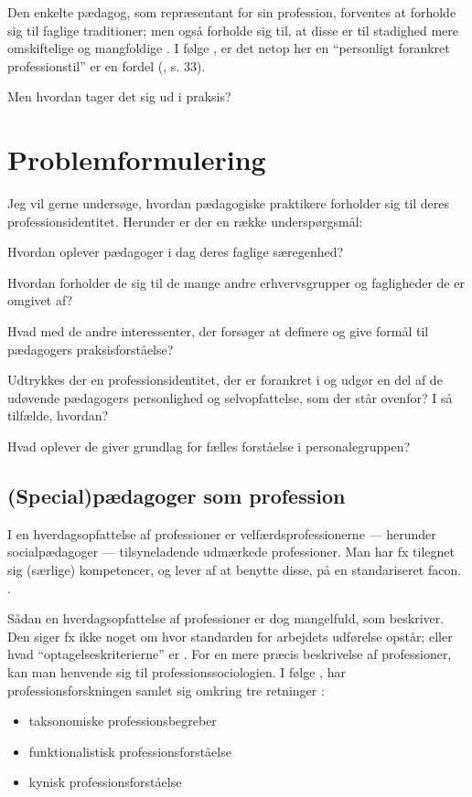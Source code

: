 Den enkelte pædagog, som repræsentant for sin profession, forventes at forholde sig til faglige traditioner; men også forholde sig til, at disse er til stadighed mere omskiftelige og mangfoldige \autocite{hansbolKonstruktionAfProfessionel2008}. I følge \citeauthor{hansbolKonstruktionAfProfessionel2008}, er det netop her en “personligt forankret professionstil” er en fordel (\citeyear{hansbolKonstruktionAfProfessionel2008}, s. 33).


Men hvordan tager det sig ud i praksis?

\section{Problemformulering}
Jeg vil gerne undersøge, hvordan pædagogiske praktikere forholder sig til deres professionsidentitet.
Herunder er der en række underspørgsmål:

Hvordan oplever pædagoger i dag deres faglige særegenhed?

Hvordan forholder de sig til de mange andre erhvervsgrupper og fagligheder de er omgivet af?

Hvad med de andre interessenter, der forsøger at definere og give formål til pædagogers praksisforståelse?

Udtrykkes der en professionsidentitet, der er forankret i og udgør en del af de udøvende pædagogers personlighed og selvopfattelse, som der står ovenfor?
I så tilfælde, hvordan?

Hvad oplever de giver grundlag for fælles forståelse i personalegruppen?

\subsection{(Special)pædagoger som profession}
I en hverdagsopfattelse af professioner er velfærdsprofessionerne — herunder socialpædagoger — tilsyneladende udmærkede professioner.
Man har fx tilegnet sig (særlige) kompetencer, og lever af at benytte disse, på en standariseret facon. \autocite[ss. 443-445]{frederiksenVelfaerdsprofessionerMellemOmsorg2017}.

Sådan en hverdagsopfattelse af professioner er dog mangelfuld, som \citeauthor{frederiksenVelfaerdsprofessionerMellemOmsorg2017} beskriver. Den siger fx ikke noget om hvor standarden for arbejdets udførelse opstår; eller hvad “optagelseskriterierne” er \autocite[s. 445]{frederiksenVelfaerdsprofessionerMellemOmsorg2017}.
For en mere præcis beskrivelse af professioner, kan man henvende sig til professionssociologien. I følge \citeauthor{frederiksenVelfaerdsprofessionerMellemOmsorg2017}, har professionsforskningen samlet sig omkring tre retninger \autocite[s. 445]{frederiksenVelfaerdsprofessionerMellemOmsorg2017}:
\begin{itemize}
  \item
    taksonomiske professionsbegreber
  \item
    funktionalistisk professionsforståelse
  \item
    kynisk professionsforståelse
\end{itemize}

